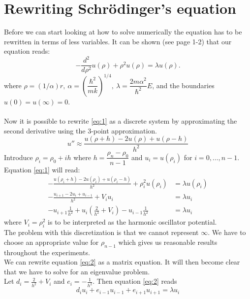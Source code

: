 \documentclass[12pt]{article}
\begin{document}
	 \section{Rewriting Schrödinger's equation}
	 Before we can start looking at how to solve numerically the equation has to be rewritten in terms of less variables. It can be shown (see \cite{projectDesc} page 1-2) that our equation reads:
	 \begin{equation} \label{eq:1}
	 -\frac{d^2}{d\rho^2} u(\rho) + \rho^2u(\rho)  = \lambda u(\rho) .
	 \end{equation}
	 where $
	  \rho = (1/\alpha) r,\: \alpha = \left(\dfrac{\hbar^2}{mk}\right)^{1/4},\: \lambda = \dfrac{2m\alpha^2}{\hbar^2}E
	 $, and the boundaries $u(0) = u(\infty) = 0$.\\ \\
	 Now it is possible to rewrite \ref{eq:1} as a discrete system by approximating the second derivative using the 3-point approximation. 
	 \begin{equation*} %
	 	u''\approx\dfrac{u(\rho+h) -2u(\rho) +u(\rho-h)}{h^2} 
	 \end{equation*}
	 Introduce $\rho_i = \rho_0 + ih$ where $h = \dfrac{\rho_n - \rho_0}{n-1}$ and $u_i = u(\rho_i)$ for $i = 0,\dots,n-1$. Equation \ref{eq:1} will read: 
	 \begin{align}
	 	-\frac{u(\rho_i+h) -2u(\rho_i) +u(\rho_i-h)}{h^2}+\rho_i^2u(\rho_i)  &= \lambda u(\rho_i) \nonumber \\
	 	-\frac{u_{i+1} -2u_i +u_{i-1} }{h^2}+V_iu_i  & = \lambda u_i \nonumber \\
	 	-u_{i+1}\frac{1}{h^2} +u_i\left(\frac{2}{h^2} + V_i\right) -u_{i-1}\frac{1}{h^2} & = \lambda u_i  \label{eq:2}
	 \end{align} 
	 where $V_i = \rho_i^2$ is to be interpreted as the harmonic oscillator potential. \\
	 The problem with this discretization is that we cannot represent $\infty$. We have to choose an appropriate value for $\rho_{n-1}$ which gives us reasonable results throughout the experiments.\\
	 We can rewrite equation \ref{eq:2} as a matrix equation. It will then become clear that we have to solve for an eigenvalue problem. \\
	 Let $d_i=\frac{2}{h^2}+V_i$ and $ e_i=-\frac{1}{h^2}$. Then equation \ref{eq:2} reads
	 \begin{equation} \label{eq:3}
	 	d_iu_i+e_{i-1}u_{i-1}+e_{i+1}u_{i+1}  = \lambda u_i
	 \end{equation}
\end{document}
